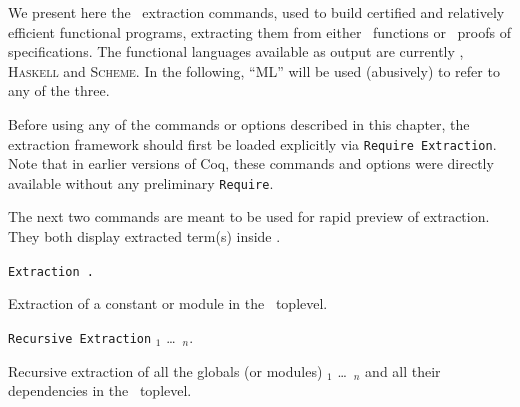 \label{Extraction}

\noindent We present here the \Coq\ extraction commands, used to build certified
and relatively efficient functional programs, extracting them from
either \Coq\ functions or \Coq\ proofs of specifications. The
functional languages available as output are currently \ocaml{},
\textsc{Haskell} and \textsc{Scheme}.  In the following, ``ML'' will
be used (abusively) to refer to any of the three.


Before using any of the commands or options described in this chapter,
the extraction framework should first be loaded explicitly
via {\tt Require Extraction}. Note that in earlier versions of Coq, these
commands and options were directly available without any preliminary
{\tt Require}.


The next two commands are meant to be used for rapid preview of
extraction. They both display extracted term(s) inside \Coq.

\begin{description}
\item {\tt Extraction \qualid{}.} ~\par
  Extraction of a constant or module in the \Coq\ toplevel.

\item {\tt Recursive Extraction} \qualid$_1$ \dots\ \qualid$_n$. ~\par
  Recursive extraction of all the globals (or modules) \qualid$_1$ \dots\
  \qualid$_n$ and all their dependencies in the \Coq\ toplevel.
\end{description}

